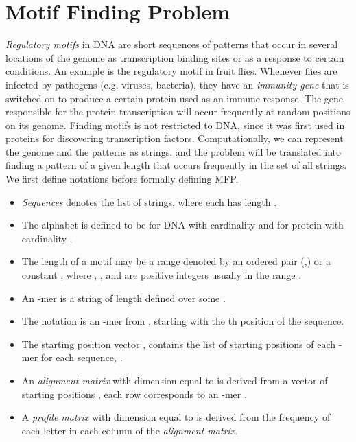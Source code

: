 \documentclass{llncs}
\begin{document}
\section{Motif Finding Problem}\label{motifFindingProblem}
\noindent  \textit{Regulatory motifs} in DNA are short sequences of patterns that occur in several locations of the genome as transcription binding sites or as a response to certain conditions. An example is the regulatory motif  in  fruit flies. Whenever flies are infected by pathogens (e.g. viruses, bacteria), they have an \textit{immunity gene} that is switched on to produce a certain protein used as an immune response. The gene responsible for the protein transcription will occur frequently at random positions on its genome. Finding motifs is not restricted to DNA, since it was first used in proteins for discovering transcription factors. Computationally, we can represent the genome and the patterns as strings, and the problem will be translated into finding a pattern of a given length that occurs frequently in the set of all strings. We first define notations before formally defining MFP.

\begin{itemize}

\item \textit{Sequences} denotes the list of  strings, where each  has length . 

\item The alphabet  is defined to be  for DNA with cardinality  and  for protein with cardinality . 

\item The length of  a motif may be a range denoted by an ordered pair (,) or a constant , where , , and  are positive integers usually in the range .

\item An -mer is a string of length  defined over some . 

\item The notation  is an -mer from , starting with the th position of the sequence.

\item The starting position vector , contains the list of starting positions of each -mer for each sequence, .

\item An \textit{alignment matrix}  with dimension equal to  is derived from a vector of starting positions , each row  corresponds to an -mer .

\item A \textit{profile matrix}  with dimension equal to  is derived from the frequency of each letter in each column of the \textit{alignment matrix}.
\end{itemize}
\end{document}
